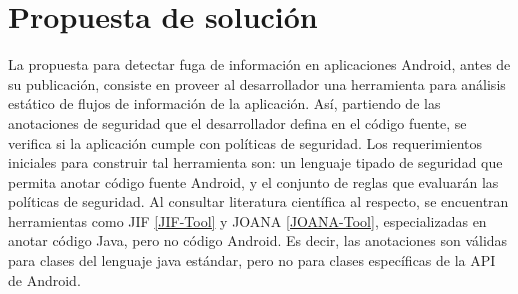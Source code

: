 \section{Propuesta de solución}
\label{sec:propuesta-sol} 
La propuesta para detectar fuga de información en aplicaciones Android, antes de
su publicación, consiste en proveer al desarrollador una herramienta para
análisis estático de flujos de información de la aplicación. Así, partiendo de
las anotaciones de seguridad que el desarrollador defina en el código fuente, se
verifica si la aplicación cumple con políticas de seguridad.\newline
Los requerimientos iniciales para construir tal herramienta son: un lenguaje
tipado de seguridad que permita anotar código fuente Android, y el conjunto de
reglas que evaluarán las políticas de seguridad.\newline 
Al consultar literatura científica al respecto, se encuentran herramientas como
JIF \ref{JIF-Tool} y JOANA \ref{JOANA-Tool}, especializadas en anotar código
Java, pero no código Android. Es decir, las anotaciones son válidas para clases
del lenguaje java estándar, pero no para clases específicas de la API de Android.

